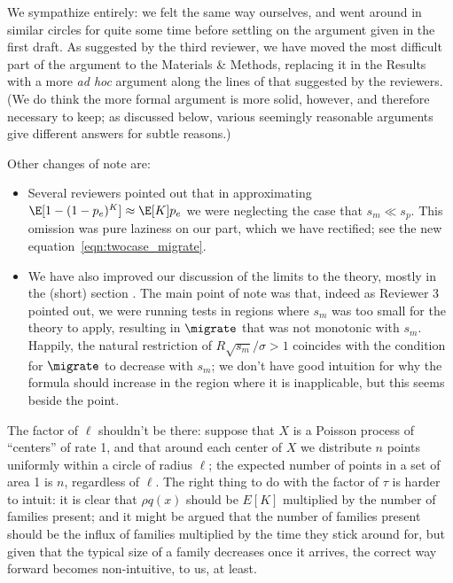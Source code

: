 We sympathize entirely: we felt the same way ourselves,
and went around in similar circles for quite some time
before settling on the argument given in the first draft.
As suggested by the third reviewer, 
we have moved the most difficult part of the argument to the Materials \& Methods,
replacing it in the Results with a more \textit{ad hoc} argument
along the lines of that suggested by the reviewers.
(We do think the more formal argument is more solid, however,
and therefore necessary to keep; 
as discussed below, various seemingly reasonable arguments
give different answers for subtle reasons.)

Other changes of note are:
\begin{itemize}


  \item Several reviewers pointed out that in approximating $\E[1-(1-p_e)^K] \approx \E[K] p_e$
    we were neglecting the case that $s_m \ll s_p$.
    This omission was pure laziness on our part,
    which we have rectified; see the new equation~\eqref{eqn:twocase_migrate}.

  \item We have also improved our discussion of the limits to the theory,
    mostly in the (short) section .
    The main point of note was that, indeed as Reviewer 3 pointed out,
    we were running tests in regions where $s_m$ was too small for the theory to apply,
    resulting in $\migrate$ that was not monotonic with $s_m$.
    Happily, the natural restriction of $R \sqrt{s_m}/\sigma > 1$ coincides with the condition
    for $\migrate$ to decrease with $s_m$;
    we don't have good intuition for why the formula should increase in the region where it is inapplicable,
    but this seems beside the point.

\end{itemize}



\reviewersection


\reply
The factor of $\ell$ shouldn't be there:
suppose that $X$ is a Poisson process of ``centers'' of rate 1, 
and that around each center of $X$ we distribute $n$ points uniformly within a circle of radius $\ell$;
the expected number of points in a set of area 1 is $n$, regardless of $\ell$.
The right thing to do with the factor of $\tau$ is harder to intuit:
it is clear that $\rho q(x)$ should be $E[K]$ multiplied by the number of families present;
and it might be argued that the number of families present should be the influx of families
multiplied by the time they stick around for,
but given that the typical size of a family decreases once it arrives,
the correct way forward becomes non-intuitive, to us, at least.

